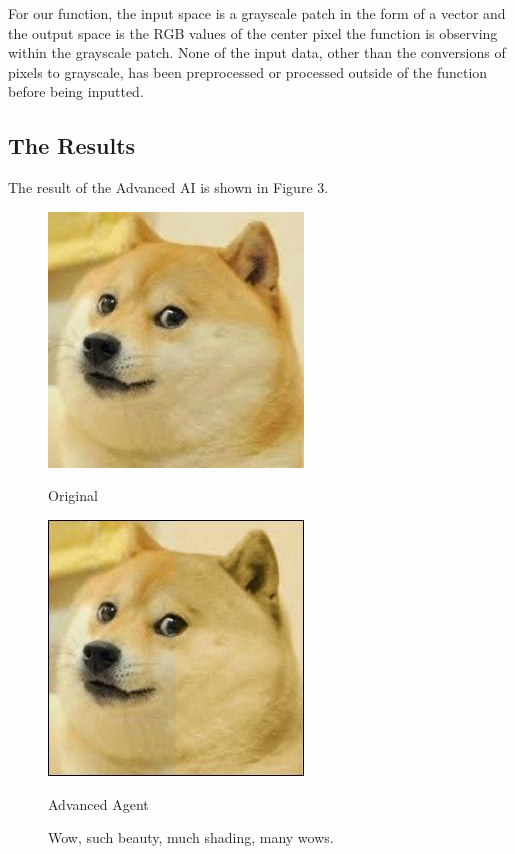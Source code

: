 \documentclass[11pt]{article}
\begin{document}
For our function, the input space is a grayscale patch in the form of a vector and the output space is the RGB values of the center pixel the function is observing within the grayscale patch. None of the input data, other than the conversions of pixels to grayscale, has been preprocessed or processed outside of the function before being inputted.

\pagebreak
\subsection{The Results}
The result of the Advanced AI is shown in Figure 3.

\begin{figure}[h]
\begin{minipage}[c]{0.5\textwidth}
\centering
\includegraphics[scale=0.94]{images/smolDoge.jpg}
\begin{center}
Original
\end{center}
\end{minipage}
\begin{minipage}[c]{0.5\textwidth}
\centering
\includegraphics[scale=0.70]{images/advanced.jpg}
\begin{center}
Advanced Agent
\end{center}
\end{minipage}
\caption{Wow, such beauty, much shading, many wows.}
\end{figure}
\end{document}
